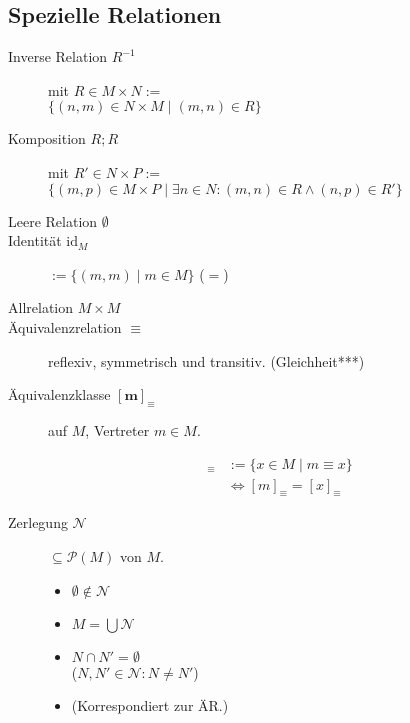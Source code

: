 \subsection{Spezielle Relationen}

\begin{mzImportant}
  \begin{description}
    \item [Inverse Relation $R^{-1}$]
          mit $R \in M \times N :=$ \\
          $\{ (n, m) \in N \times M \mid (m, n) \in R \}$

    \item [Komposition $R ; R$]
          mit $R' \in N \times P :=$ \\
          $\{ (m, p) \in M \times P \mid \exists n \in N: (m, n) \in R \land (n, p) \in R' \}$

    \item [Leere Relation $\emptyset$]

    \item [Identität $\text{id}_M$]
          $:= \{ (m,m) \mid m \in M \}$ ($=$)

    \item [Allrelation $M \times M$]

    \item [Äquivalenzrelation $\boldsymbol{\equiv}$]
          reflexiv, symmetrisch und transitiv. (Gleichheit***)

          \item[Äquivalenzklasse $\mathbf{[m]_\equiv}$]
          auf $M$, Vertreter $m \in M$.

          \begin{align*}
            [m]_\equiv & := \{ x \in M \mid m \equiv x \}        \\
                       & \Leftrightarrow [m]_\equiv = [x]_\equiv
          \end{align*}

    \item [Zerlegung $\boldsymbol{\mathcal{N}}$]
          $\subseteq \mathcal{P}(M)$ von $M$.

          \begin{itemize}
            \item $\emptyset \notin \mathcal{N}$
            \item $M = \bigcup \mathcal{N}$
            \item $N \cap N' = \emptyset$ \\
                  ($N, N' \in \mathcal{N}: N \neq N'$)
            \item (Korrespondiert zur ÄR.)
          \end{itemize}


\end{description}
\end{mzImportant}
